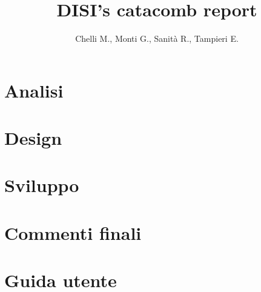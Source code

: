 \documentclass[a4paper]{report}
\title{DISI's catacomb report}
\author{Chelli M., Monti G., Sanità R., Tampieri E.}
\begin{document}
	\maketitle
	\tableofcontents
	\section{Analisi}
	\section{Design}
	\section{Sviluppo}
	\section{Commenti finali}
	\section{Guida utente}
\end{document}
